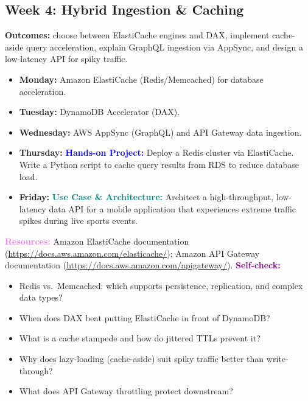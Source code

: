 \documentclass[11pt, a4paper]{article}
\newcommand{\project}[1]{\vspace{1mm}\noindent\textbf{\textcolor{blue}{Hands-on Project:}} #1}
\newcommand{\usecase}[1]{\vspace{1mm}\noindent\textbf{\textcolor{teal}{Use Case \& Architecture:}} #1}
\newcommand{\dayitem}[2]{\item \textbf{#1:} #2}
\newcommand{\resources}[1]{\vspace{1mm}\noindent\textbf{\textcolor{violet}{Resources:}} #1}
\newcommand{\selfcheck}[1]{\vspace{1mm}\noindent\textbf{\textcolor{purple}{Self-check:}} #1}
\begin{document}
\subsection*{Week 4: Hybrid Ingestion \& Caching}
\par\noindent\textbf{Outcomes:} choose between ElastiCache engines and DAX, implement cache-aside query acceleration, explain GraphQL ingestion via AppSync, and design a low-latency API for spiky traffic.
\begin{itemize}[label=-]
    \dayitem{Monday}{Amazon ElastiCache (Redis/Memcached) for database acceleration.}
    \dayitem{Tuesday}{DynamoDB Accelerator (DAX).}
    \dayitem{Wednesday}{AWS AppSync (GraphQL) and API Gateway data ingestion.}
    \dayitem{Thursday}{\project{Deploy a Redis cluster via ElastiCache. Write a Python script to cache query results from RDS to reduce database load.}}
    \dayitem{Friday}{\usecase{Architect a high-throughput, low-latency data API for a mobile application that experiences extreme traffic spikes during live sports events.}}
\end{itemize}
\resources{Amazon ElastiCache documentation (\url{https://docs.aws.amazon.com/elasticache/}); Amazon API Gateway documentation (\url{https://docs.aws.amazon.com/apigateway/}).}
\selfcheck{\begin{itemize}[label=-, leftmargin=1.5em, itemsep=0pt]
    \item Redis vs.\ Memcached: which supports persistence, replication, and complex data types?
    \item When does DAX beat putting ElastiCache in front of DynamoDB?
    \item What is a cache stampede and how do jittered TTLs prevent it?
    \item Why does lazy-loading (cache-aside) suit spiky traffic better than write-through?
    \item What does API Gateway throttling protect downstream?
\end{itemize}}
\end{document}
